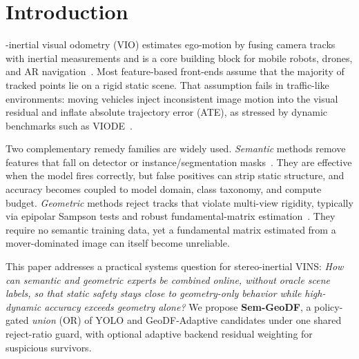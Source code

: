 \documentclass{ieeeaccess}
\begin{document}
\titlepgskip=-15pt

\maketitle

\section{Introduction}
\label{sec:introduction}
-inertial visual odometry (VIO) estimates ego-motion by fusing camera tracks with inertial measurements and is a core building block for mobile robots, drones, and AR navigation~\cite{qin2018vins,qin2019vinsfusion}.
Most feature-based front-ends assume that the majority of tracked points lie on a rigid static scene.
That assumption fails in traffic-like environments: moving vehicles inject inconsistent image motion into the visual residual and inflate absolute trajectory error (ATE), as stressed by dynamic benchmarks such as VIODE~\cite{minoda2021viode}.

Two complementary remedy families are widely used.
\emph{Semantic} methods remove features that fall on detector or instance/segmentation masks~\cite{bescos2018dynaslam,yu2018dsslam,song2022dynavins}.
They are effective when the model fires correctly, but false positives can strip static structure, and accuracy becomes coupled to model domain, class taxonomy, and compute budget.
\emph{Geometric} methods reject tracks that violate multi-view rigidity, typically via epipolar Sampson tests and robust fundamental-matrix estimation~\cite{hartley2003multiple}.
They require no semantic training data, yet a fundamental matrix estimated from a mover-dominated image can itself become unreliable.

This paper addresses a practical systems question for stereo-inertial VINS:
\emph{How can semantic and geometric experts be combined online, without oracle scene labels, so that static safety stays close to geometry-only behavior while high-dynamic accuracy exceeds geometry alone?}
We propose \textbf{Sem-GeoDF}, a policy-gated \emph{union} (OR) of YOLO and GeoDF-Adaptive candidates under one shared reject-ratio guard, with optional adaptive backend residual weighting for suspicious survivors.
\end{document}
